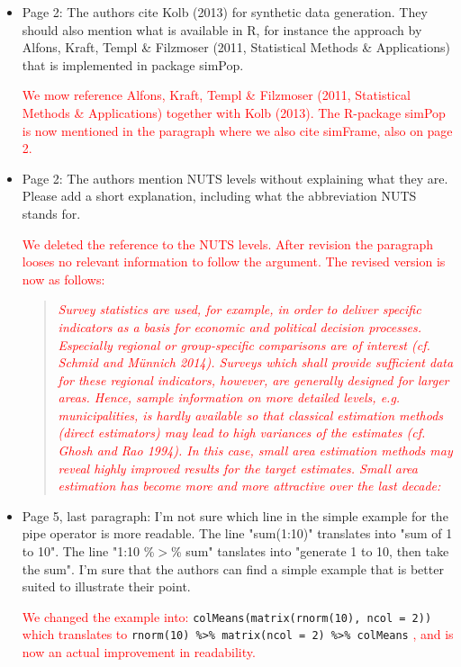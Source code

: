 \documentclass[11pt]{article}
\begin{document}
\begin{itemize}
\item
	Page 2: The authors cite Kolb (2013) for synthetic data generation. They should also mention what is available in R, for instance the approach by Alfons, Kraft, Templ \& Filzmoser (2011, Statistical Methods \& Applications) that is implemented in package simPop.
	
	\textcolor{red}{We mow reference Alfons, Kraft, Templ \& Filzmoser (2011, Statistical Methods \& Applications) together with Kolb (2013). The R-package simPop is now mentioned in the paragraph where we also cite simFrame, also on page 2.}

\item
	Page 2: The authors mention NUTS levels without explaining what they are. Please add a short explanation, including what the abbreviation NUTS stands for.
	
	\textcolor{red}{We deleted the reference to the NUTS levels. After revision the paragraph looses no relevant information to follow the argument. The revised version is now as follows:}
	
	\begin{quote}
	\textit{\textcolor{red}{
	Survey statistics are used, for example, in order to deliver specific indicators as a basis for
economic and political decision processes. Especially regional or group-specific comparisons
are of interest (cf. Schmid and Münnich 2014). Surveys which shall provide sufficient data
for these regional indicators, however, are generally designed for larger areas. Hence, sample
information on more detailed levels, e.g. municipalities, is hardly available so that classical
estimation methods (direct estimators) may lead to high variances of the estimates (cf. Ghosh
and Rao 1994). In this case, small area estimation methods may reveal highly improved results
for the target estimates. Small area estimation has become more and more attractive over
the last decade:
	}}
	\end{quote}

\item
	Page 5, last paragraph: I'm not sure which line in the simple example for the pipe operator is more readable. The line "sum(1:10)" translates into "sum of 1 to 10". The line "1:10 \%$>$\% sum" tanslates into "generate 1 to 10, then take the sum". I'm sure that the authors can find a simple example that is better suited to illustrate their point.
	
	\textcolor{red}{We changed the example into:}
	\verb'colMeans(matrix(rnorm(10), ncol = 2))' \textcolor{red}{which translates to} \verb'rnorm(10) %>% matrix(ncol = 2) %>% colMeans' \textcolor{red}{, and is now an actual improvement in readability.}


\end{itemize}
\end{document}
